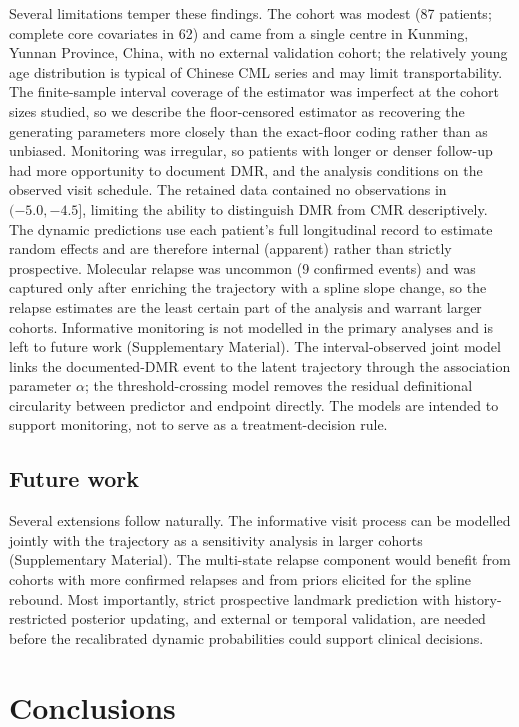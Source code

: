 \documentclass[11pt]{article}
\begin{document}
Several limitations temper these findings. The cohort was modest (87
patients; complete core covariates in 62) and came from a single centre in
Kunming, Yunnan Province, China, with no external validation cohort; the
relatively young age distribution is typical of Chinese CML series and may
limit transportability. The finite-sample interval coverage of the estimator
was imperfect at the cohort sizes studied, so we describe the floor-censored
estimator as recovering the generating parameters more closely than the
exact-floor coding rather than as unbiased. Monitoring was irregular, so
patients with longer or denser follow-up had more opportunity to document
DMR, and the analysis conditions on the observed visit schedule. The
retained data contained no observations in $(-5.0,-4.5]$, limiting the
ability to distinguish DMR from CMR descriptively. The dynamic predictions
use each patient's full longitudinal record to estimate random effects and
are therefore internal (apparent) rather than strictly prospective. Molecular
relapse was uncommon (9 confirmed events) and was captured only after enriching
the trajectory with a spline slope change, so the relapse estimates are the
least certain part of the analysis and warrant larger cohorts. Informative
monitoring is not modelled in the primary analyses and is left to future work
(Supplementary Material). The interval-observed joint model links the
documented-DMR event to the latent trajectory through the association parameter
$\alpha$; the threshold-crossing model removes the residual definitional
circularity between predictor and endpoint directly. The models are intended to
support monitoring, not to serve as a treatment-decision rule.

\subsection{Future work}

Several extensions follow naturally. The informative visit process can be
modelled jointly with the trajectory as a sensitivity analysis in larger
cohorts (Supplementary Material). The multi-state relapse component would
benefit from cohorts with more confirmed relapses and from priors elicited for
the spline rebound. Most importantly, strict prospective landmark prediction
with history-restricted posterior updating, and external or temporal
validation, are needed before the recalibrated dynamic probabilities could
support clinical decisions.

\section{Conclusions}
\end{document}
